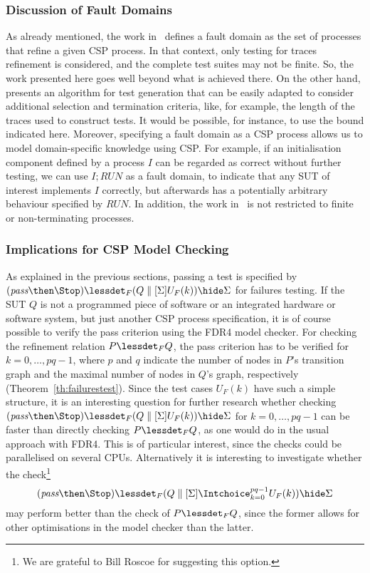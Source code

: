 \subsubsection*{Discussion of Fault Domains}
As already mentioned, the work in~\cite{DBLP:conf/pts/CavalcantiS17} defines
a fault domain as the set of processes that refine a given CSP process.  In
that context, only testing for traces refinement is considered, and the
complete test suites may not be finite. So, the work presented here goes well
beyond what is achieved there. On the other hand,
\cite{DBLP:conf/pts/CavalcantiS17} presents an algorithm for test generation
that can be easily adapted to consider additional selection and termination
criteria, like, for example, the length of the traces used to construct
tests. It would be possible, for instance, to use the bound indicated here.
Moreover, specifying a fault domain as a CSP process allows us to model
domain-specific knowledge using CSP. For example, if an initialisation
component defined by a process $I$ can be regarded as correct without further
testing, we can use $I; RUN$ as a fault domain, to indicate that any SUT of
interest implements $I$ correctly, but afterwards has a potentially arbitrary
behaviour specified by $RUN$. In addition, the work
in~\cite{DBLP:conf/pts/CavalcantiS17} is not restricted to finite or
non-terminating processes.

\subsubsection*{Implications for CSP Model Checking}
As explained in the previous sections, passing a test is specified by
$(\epass\then\Stop) \lessdet_F (Q\parallel[\Sigma] U_F(k)) \hide \Sigma$ for
failures testing. If the SUT $Q$ is not a programmed piece of software or an
integrated hardware or software system, but just another CSP process
specification, it is of course possible to verify the pass criterion using
the FDR4 model checker. For checking the refinement relation $P\lessdet_F Q$,
the pass criterion has to be verified for $k=0,\dots,pq-1$, where $p$ and $q$
indicate the number of nodes in $P$'s transition graph and the maximal number
of nodes in $Q$'s graph, respectively (Theorem~\ref{th:failurestest}). Since
the test cases $U_F(k)$ have such a simple structure, it is an interesting
question for further research whether checking $(\epass\then\Stop) \lessdet_F
(Q\parallel[\Sigma] U_F(k)) \hide \Sigma$ for $k=0,\dots,pq-1$ can be faster
than directly checking $P\lessdet_F Q$, as one would do in the usual approach
with FDR4. This is of particular interest, since the checks could be
parallelised on several CPUs. Alternatively it is interesting to investigate
whether the check\footnote{We are grateful to Bill Roscoe for suggesting this
option.}
\[
(\epass\then\Stop) \lessdet_F (Q\parallel[\Sigma] \Intchoice_{k=0}^{pq-1} U_F(k)) \hide \Sigma
\]
may perform better than the check of $P\lessdet_F Q$, since the former allows for
other optimisations in the model checker than the latter.

